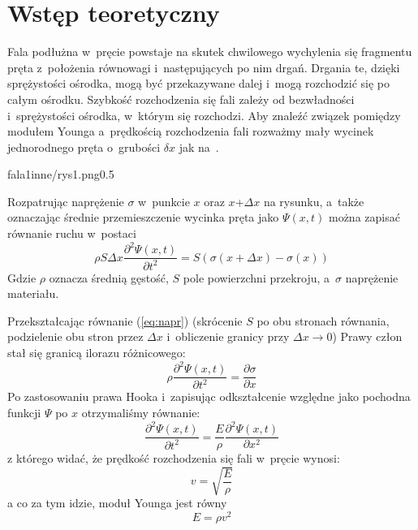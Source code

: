\documentclass{fizraport}
\begin{document}
\maketitle

\section{Wstęp teoretyczny}
Fala podłużna w~pręcie powstaje na skutek chwilowego wychylenia się
fragmentu pręta z~położenia równowagi i~następujących po nim drgań.
Drgania te, dzięki sprężystości ośrodka, mogą być przekazywane dalej i~mogą
rozchodzić się po całym ośrodku. Szybkość rozchodzenia się fali zależy
od bezwładności i~sprężystości ośrodka, w~którym się rozchodzi.
Aby znaleźć związek pomiędzy modułem Younga a~prędkością rozchodzenia
fali rozważmy mały wycinek jednorodnego pręta o~grubości $\delta x$ jak na~.

{fala1}{inne/rys1.png}{0.5\textwidth}


Rozpatrując naprężenie $\sigma$ w~punkcie $x$ oraz $x$+$\Delta{x}$ na rysunku, a~także oznaczając średnie przemieszczenie wycinka pręta jako $\Psi(x,t)$ można zapisać równanie ruchu w~postaci
%
\begin{equation}
\label{eq:napr}
\rho S \Delta{x}\frac{\partial^2\Psi(x,t)}{\partial t^2} = S(\sigma(x+\Delta{x})-\sigma(x))
\end{equation}
%
Gdzie $\rho$ oznacza średnią gęstość, $S$ pole powierzchni przekroju, a~$\sigma$
naprężenie materiału.
\pagebreak

Przekształcając równanie (\ref{eq:napr}) (skrócenie $S$ po obu stronach równania,
podzielenie obu stron przez $\Delta{x}$ i~obliczenie granicy przy $\Delta{x}\rightarrow0$) Prawy człon stał się granicą ilorazu różnicowego:
\begin{equation*}
    \rho\frac{\partial^2\Psi(x,t)}{\partial t^2} = \frac{\partial\sigma}{\partial x}
\end{equation*}
%
Po zastosowaniu prawa Hooka i~zapisując odkształcenie względne jako pochodna funkcji $\Psi$ po $x$ otrzymaliśmy równanie:
\begin{equation*}
    \frac{\partial^2\Psi(x,t)}{\partial t^2} = \frac{E}{\rho}\frac{\partial^2\Psi(x,t)}{\partial x^2}
\end{equation*}
%
z którego widać, że prędkość rozchodzenia się fali w~pręcie wynosi:
\begin{equation*}
    v = \sqrt{\frac{E}{\rho}}
\end{equation*}
%
a co za tym idzie, moduł Younga jest równy \[E = \rho v^2\]
\end{document}
